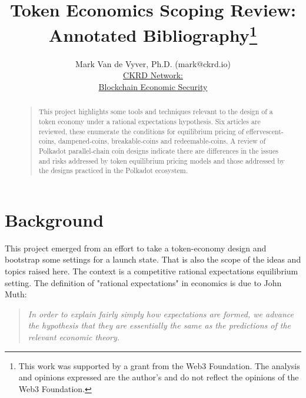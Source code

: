 \documentclass[11pt]{article}
\def \ckrdurl{https://ckrd.io/}
\begin{document}


\title{Token Economics Scoping Review:\\Annotated Bibliography\footnote{This work was supported by a grant from the Web3 Foundation. The analysis and opinions expressed are the author's and do not reflect the opinions of the Web3 Foundation.}}
\author{Mark Van de Vyver, Ph.D. (mark@ckrd.io)\\
\href{\ckrdurl}{CKRD Network:}\\
\href{\ckrdurl}{Blockchain Economic Security}\\
}
\maketitle
\begin{abstract}
\begin{quote}
This project highlights some tools and techniques relevant to the design of a token economy under a rational expectations hypothesis.  Six articles are reviewed, these enumerate the conditions for equilibrium pricing of effervescent-coins, dampened-coins, breakable-coins and redeemable-coins. A review of Polkadot parallel-chain coin designs indicate there are differences in the issues and risks addressed by token equilibrium pricing models and those addressed by the designs practiced in the Polkadot ecosystem.
\end{quote}
\end{abstract}

\tableofcontents

\section{Background}
This project emerged from an effort to take a token-economy design and bootstrap some settings for a launch state. That is also the scope of the ideas and topics raised here.  The context is a competitive rational expectations equilibrium setting.  The definition of "rational expectations" in economics is due to John Muth\autocite{muth61}:

\begin{quote}
    \textit{In order to explain fairly simply how expectations are formed, we advance the hypothesis that they are essentially the same as the predictions of the relevant economic theory.}
\end{quote}
\end{document}
